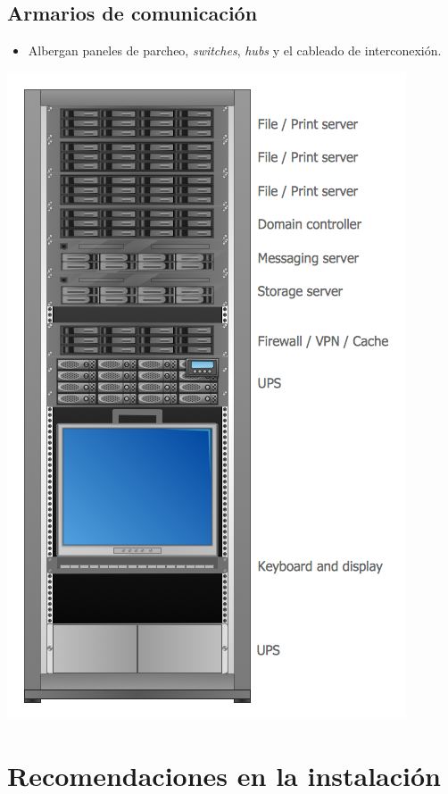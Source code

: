 \documentclass[11pt]{article}
\begin{document}
\subsection{Armarios de comunicación}
\label{sec:orgd9edaae}
\begin{itemize}
\item Albergan paneles de parcheo, \emph{switches}, \emph{hubs} y el cableado de interconexión.
\end{itemize}
\begin{center}
\includegraphics[width=.9\linewidth]{./media/COMPUTERS-AND-NETWORKS-Rack-diagrams-Typical-Server-Rack-Diagram.png}
\end{center}

\section{Recomendaciones en la instalación}
\label{sec:org61b90c0}
\end{document}
